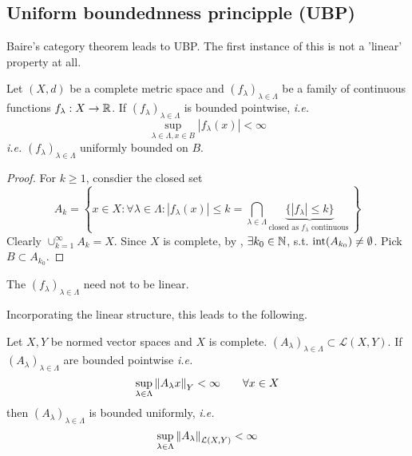 \documentclass{article}
\begin{document}
\subsection{Uniform boundednness principple (UBP)}

Baire's category theorem leads to UBP. The first instance of this is not a 'linear' property at all.

\begin{theorem}
\label{uniform bounded but not linear}
    Let $(X,d)$ be a complete metric space and $(f_\lambda)_{\lambda \in \Lambda}$ be a family of continuous functions $f_{\lambda}:X \to \mathbb{R}$. If $(f_\lambda)_{\lambda \in \Lambda}$ is bounded pointwise, \textit{i.e.}  
    $$
    \sup_{\lambda \in \Lambda, x\in B} |f_{\lambda}(x)|<\infty
    $$
    \textit{i.e.} $(f_{\lambda})_{\lambda \in \Lambda}$ uniformly bounded on $B$.
\end{theorem}

\begin{proof}
    For $k\geq 1$, consdier the closed set  
    $$
    A_k = \left\{x \in X: \forall \lambda \in \Lambda: |f_{\lambda}(x)|\leq k = \bigcap_{\lambda\in \Lambda} \underbrace{\{|f_{\lambda}|\leq k\}}_{\text{closed\ as\ $f_{\lambda}$\ continuous\ }}\right\}
    $$
    Clearly $\cup_{k=1}^{\infty}A_k=X$. Since $X$ is complete,  
    by , $\exists k_0 \in \mathbb{N}$, s.t. $\textrm{int} (A_{k_0})\neq \emptyset$. Pick $B\subset A_{k_0}$.
\end{proof}

\begin{remark}
    The $(f_\lambda)_{\lambda \in \Lambda}$ need not to be linear.
\end{remark}

Incorporating the linear structure, this leads to the following.  

\begin{corollary}
\label{banach steinhaus}
Let $X,Y$ be normed vector spaces and $X$ is complete. $(A_\lambda)_{\lambda \in \Lambda} \subset \mathcal{L}(X,Y)$. If $(A_{\lambda})_{\lambda \in \Lambda}$ are bounded pointwise \textit{i.e.}  
$$
\sup_{\lambda \in \Lambda} \left\|{A_\lambda x}\right\|_Y < \infty \qquad \forall x\in X
$$  
then $(A_{\lambda})_{\lambda \in \Lambda}$ is bounded uniformly, \textit{i.e.}  
$$
\sup_{\lambda \in \Lambda} \left\|{A_\lambda}\right\|_{\mathcal{L}(X,Y)} < \infty
$$
\end{corollary}
\end{document}
